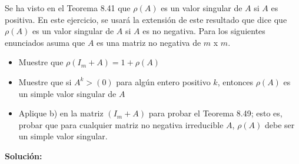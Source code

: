 Se ha visto en el Teorema 8.41 que $\rho(A)$ es un valor singular de $A$ si $A$ es positiva. En este ejercicio, se usará la extensión de este resultado que dice que $\rho(A)$ es un valor singular de $A$ si $A$ es no negativa. Para los siguientes enunciados asuma que $A$ es una matriz no negativa de $m$ x $m$.

\begin{itemize}
    \item Muestre que $\rho(I_m + A) = 1 + \rho(A)$
    
    \item Muestre que si $ A^k > (0) $ para algún entero positivo $k$, entonces $\rho(A)$ es un simple valor singular de $A$
    
    \item Aplique b) en la matriz $(I_m + A)$ para probar el Teorema 8.49; esto es, probar que para cualquier matriz no negativa irreducible $A$, $\rho(A)$ debe ser un simple valor singular.
\end{itemize}


\textbf{Solución:}

